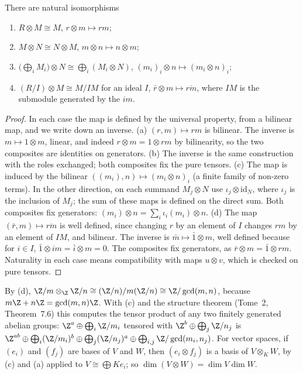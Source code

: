 \begin{proposition}\label{prop:tensorrules}
There are natural isomorphisms
\begin{enumerate}[label=(\alph*)]
\item $R\otimes M\cong M$, $r\otimes m\mapsto rm$;
\item $M\otimes N\cong N\otimes M$, $m\otimes n\mapsto n\otimes m$;
\item $\bigl(\bigoplus_iM_i\bigr)\otimes N\cong\bigoplus_i(M_i\otimes N)$, $(m_i)_i\otimes n\mapsto(m_i\otimes n)_i$;
\item $(R/I)\otimes M\cong M/IM$ for an ideal $I$, $\bar r\otimes m\mapsto\overline{rm}$, where $IM$ is the submodule generated by the $im$.
\end{enumerate}
\end{proposition}

\begin{proof}
In each case the map is defined by the universal property, from a bilinear map, and we write down an inverse.
(a) $(r,m)\mapsto rm$ is bilinear. The inverse is $m\mapsto1\otimes m$, linear, and indeed $r\otimes m=1\otimes rm$ by bilinearity, so the two composites are identities on generators.
(b) The inverse is the same construction with the roles exchanged; both composites fix the pure tensors.
(c) The map is induced by the bilinear $((m_i),n)\mapsto(m_i\otimes n)_i$ (a finite family of non-zero terms). In the other direction, on each summand $M_j\otimes N$ use $\iota_j\otimes\mathrm{id}_N$, where $\iota_j$ is the inclusion of $M_j$; the sum of
these maps is defined on the direct sum. Both composites fix generators: $(m_i)\otimes n=\sum_i\iota_i(m_i)\otimes n$.
(d) The map $(\bar r,m)\mapsto\overline{rm}$ is well defined, since changing $r$ by an element of $I$ changes $rm$ by an element of $IM$, and bilinear. The inverse is $\bar m\mapsto\bar1\otimes m$, well defined because for $i\in I$,
$\bar1\otimes im=\bar i\otimes m=0$. The composites fix generators, as $\bar r\otimes m=\bar1\otimes rm$.
Naturality in each case means compatibility with maps $u\otimes v$, which is checked on pure tensors.
\end{proof}

\begin{example}\label{ex:zmzn}
By (d), $\Z/m\otimes_{\Z}\Z/n\cong(\Z/n)/m(\Z/n)\cong\Z/\gcd(m,n)$, because $m\Z+n\Z=\gcd(m,n)\Z$. With (c) and the structure theorem (Tome~2, Theorem~7.6) this computes the tensor product of any two finitely
generated abelian groups: $\Z^a\oplus\bigoplus_i\Z/m_i$ tensored with $\Z^b\oplus\bigoplus_j\Z/n_j$ is $\Z^{ab}\oplus\bigoplus_i(\Z/m_i)^b\oplus\bigoplus_j(\Z/n_j)^a\oplus\bigoplus_{i,j}\Z/\gcd(m_i,n_j)$. For
vector spaces, if $(e_i)$ and $(f_j)$ are bases of $V$ and $W$, then $(e_i\otimes f_j)$ is a basis of $V\otimes_KW$, by (c) and (a) applied to $V\cong\bigoplus Ke_i$; so $\dim(V\otimes W)=\dim V\dim W$.
\end{example}

